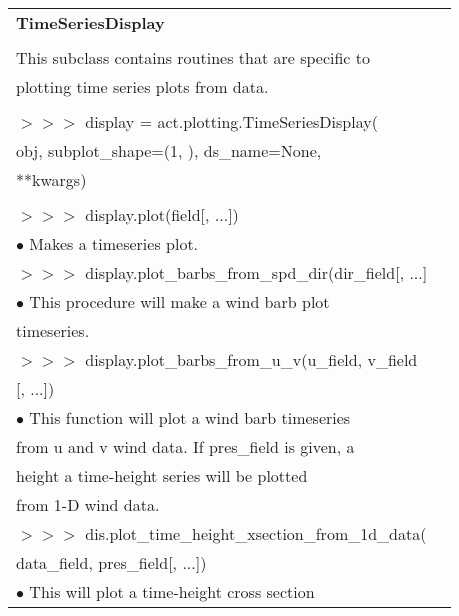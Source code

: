 \documentclass[potrait, z1paper, fontscale=0.33]{baposter} %
\begin{document}
\begin{poster}
{\begin{flushleft}
\begin{tabular}{@{}ll@{}}
\\
\multicolumn{2}{l}{\cellcolor[HTML]{DDFFFF}\bf TimeSeriesDisplay} \\
\\
This subclass contains routines that are specific to\\
plotting time series plots from data.\\
\\
$>$$>$$>$ display = act.plotting.TimeSeriesDisplay(\\
\-\hspace{1.2cm} obj, subplot\_shape=(1, ), ds\_name=None,\\
\-\hspace{1.2cm} **kwargs)\\
\\
$>$$>$$>$ display.plot(field[, ...])\\
\-\hspace{0.2cm} $\bullet$ Makes a timeseries plot.\\
$>$$>$$>$ display.plot\_barbs\_from\_spd\_dir(dir\_field[, ...]\\
\-\hspace{0.2cm} $\bullet$ This procedure will make a wind barb plot\\
\-\hspace{0.5cm} timeseries.\\
$>$$>$$>$ display.plot\_barbs\_from\_u\_v(u\_field, v\_field\\
\-\hspace{1.2cm}  [, ...])\\
\-\hspace{0.2cm} $\bullet$ This function will plot a wind barb timeseries\\
\-\hspace{0.5cm} from u and v wind data. If pres\_field is given, a\\
\-\hspace{0.5cm} height a time-height series will be plotted\\
\-\hspace{0.5cm} from 1-D wind data.\\
$>$$>$$>$ dis.plot\_time\_height\_xsection\_from\_1d\_data(\\
\-\hspace{1.2cm} data\_field, pres\_field[, ...])\\
\-\hspace{0.2cm} $\bullet$ This will plot a time-height cross section\\

\end{tabular}
\end{flushleft}}
\end{poster}
\end{document}

